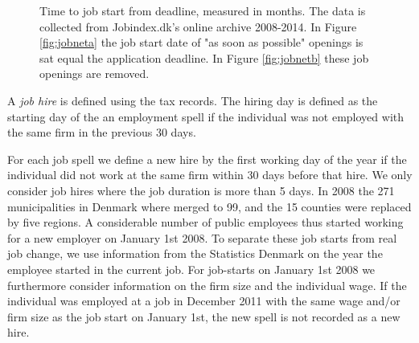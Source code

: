 \documentclass[11pt,article]{memoir}
\begin{document}
\begin{figure}[h!]
	\caption{Time to job start from deadline, measured in months. The data is collected from Jobindex.dk's online archive 2008-2014. In Figure \ref{fig:jobneta} the job start date of "as soon as possible" openings is sat equal the application deadline. In Figure \ref{fig:jobnetb} these job openings are removed.}
	\label{fig:jobnet}
\end{figure}

A \textit{job hire} is defined using the tax records. The hiring day is defined as the starting day of the an employment spell if the individual was not employed with the same firm in the previous 30 days.

For each job spell we define a new hire by the first working day of the year if the individual did not work at the same firm within 30 days before that hire. We only consider job hires where the job duration is more than 5 days. In 2008 the  271 municipalities in Denmark where merged to 99, and the 15 counties were replaced by five regions. A considerable number of public employees thus started working for a new employer on January 1st 2008. To separate these job starts from real job change, we use information from the Statistics Denmark on the year the employee started in the current job. For job-starts on January 1st 2008 we furthermore consider information on the firm size and the individual wage. If the individual was employed at a job in December 2011 with the same wage and/or firm size as the job start on January 1st, the new spell is not recorded as a new hire. 
\end{document}
